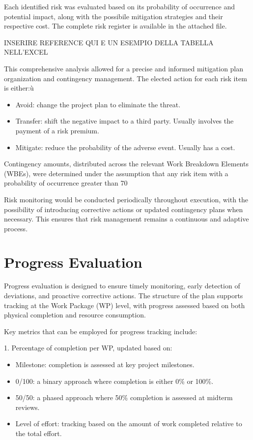 \documentclass[12pt]{article}
\begin{document}
Each identified risk was evaluated based on its probability of occurrence and potential impact, along with the possibile mitigation strategies and their respective cost.
The complete risk register is available in the attached file.

INSERIRE REFERENCE QUI E UN ESEMPIO DELLA TABELLA NELL'EXCEL

This comprehensive analysis allowed for a precise and informed mitigation plan organization and contingency management.
The elected action for each risk item is either:ù
\begin{itemize}
        \item Avoid: change the project plan to eliminate the threat.
        \item Transfer: shift the negative impact to a third party. Usually involves the payment of a risk premium.
        \item Mitigate: reduce the probability of the adverse event. Usually has a cost.
\end{itemize}

Contingency amounts, distributed across the relevant Work Breakdown Elements (WBEs), were determined under the assumption that any risk item with a probability of occurrence greater than 70%

Risk monitoring would be conducted periodically throughout execution, with the possibility of introducing corrective actions or updated contingency plans when necessary. This ensures that risk management remains a continuous and adaptive process.

\section{Progress Evaluation}

Progress evaluation is designed to ensure timely monitoring, early detection of deviations, and proactive corrective actions. The structure of the plan supports tracking at the Work Package (WP) level, with progress assessed based on both physical completion and resource consumption.

Key metrics that can be employed for progress tracking include:

1.   Percentage of completion per WP, updated based on:
\begin{itemize}
        \item Milestone: completion is assessed at key project milestones.
        \item 0/100: a binary approach where completion is either 0\% or 100\%.
        \item 50/50: a phased approach where 50\% completion is assessed at midterm reviews.
        \item Level of effort: tracking based on the amount of work completed relative to the total effort.
\end{itemize}
\end{document}
